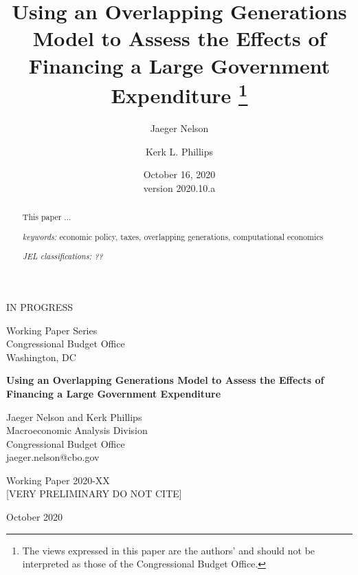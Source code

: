 \documentclass[letterpaper,12pt]{article}
\numberwithin{equation}{section}
\numberwithin{figure}{section}
\numberwithin{table}{section}
\begin{document}
\begin{titlepage}
	\title{Using an Overlapping Generations Model to Assess the Effects of Financing a Large Government Expenditure
	\thanks{The views expressed in this paper are the authors' and should not be interpreted as those of the Congressional Budget Office.}}

    \author[1]{Jaeger Nelson}
	\author[1]{Kerk L. Phillips}


	\date{October 16, 2020\\
	\small{version 2020.10.a}}
	
	\maketitle

	\vspace{-0.3 in}
	\begin{abstract}
	\small{
	This paper ... 

	\vspace{0.1 in}

	\textit{keywords:} economic policy, taxes, overlapping generations, computational economics

	\vspace{0.1 in}

	\textit{JEL classifications: ??} }
	\end{abstract}

	\centering
	IN PROGRESS
	\thispagestyle{empty}
\end{titlepage}


\pagestyle{empty}

\begin{center}
Working Paper Series\\
Congressional Budget Office\\
Washington, DC\vspace{0.75in}

\textbf{\Large Using an Overlapping Generations Model to Assess the Effects of Financing a Large Government Expenditure}

\vspace{5em}

Jaeger Nelson and Kerk Phillips\\
Macroeconomic Analysis Division\\
Congressional Budget Office\\
jaeger.nelson@cbo.gov

\vspace{5em}

Working Paper 2020-XX\\

\vspace{2em}
\Large [VERY PRELIMINARY DO NOT CITE]\\
\vspace{2em}
\normalsize

October 2020\\

\end{center}
\end{document}
